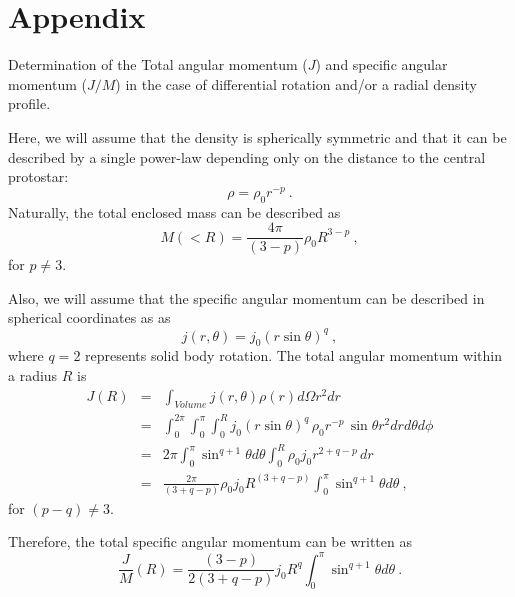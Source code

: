 \section{Appendix}
Determination of the Total angular momentum ($J$) and specific angular momentum ($J/M$) in the case of differential rotation and/or a radial density profile.

Here, we will assume that the density is spherically symmetric and that it can be described 
by a single power-law depending only on the distance to the central protostar:
\begin{equation}
\rho = \rho_0 r^{-p}~. \label{eq:density}
\end{equation}
Naturally, the total enclosed mass can be described as 
\begin{equation}
M(<R) = \frac{4\pi}{(3-p)} \rho_0 R^{3-p}~,
\end{equation}
for $p\ne 3$.

Also, we will assume that the specific angular momentum can be described in spherical coordinates as as
\begin{equation}
j(r,\theta) = j_0 ( r \sin \theta)^q~,
\end{equation}
where $q=2$ represents solid body rotation.
%
The total angular momentum within a radius $R$ is
\begin{eqnarray}
J(R) &=& \int_{Volume} j(r,\theta) \rho(r) d\Omega r^2 dr \\
&=& \int_0^{2\pi}\int_{0}^{\pi}\int_0^R j_0 ( r \sin \theta)^q\, \rho_0 r^{-p}\, \sin\theta r^2 dr d\theta d\phi\\
&=& 2\pi \int_{0}^{\pi} \sin^{q+1} \theta d\theta \int_0^R \rho_0 j_0 r^{2+q-p} \,dr \nonumber \\
&=& \frac{2\pi}{(3+q-p)}\rho_0 j_0 R^{(3+q-p)} \int_{0}^{\pi} \sin^{q+1} \theta d\theta~,
\end{eqnarray}
for $(p-q)\ne 3$.

Therefore, the total specific angular momentum can be written as
\begin{equation}
\frac{J}{M}(R) = \frac{(3-p)}{2(3+q-p)} j_0 R^{q} 
\int_{0}^{\pi} \sin^{q+1} \theta d\theta~.
\end{equation}


  
  